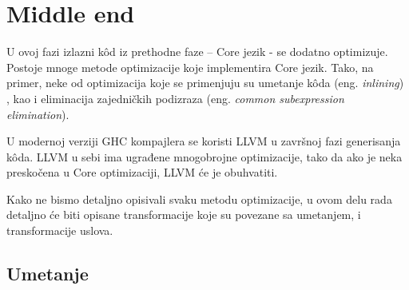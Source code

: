 \section{Middle end}
\label{sec:middle}

U ovoj fazi izlazni k\^{o}d iz prethodne faze – Core jezik - se dodatno optimizuje. Postoje mnoge metode optimizacije koje implementira Core jezik. Tako, na primer, neke od optimizacija koje se primenjuju su umetanje k\^{o}da (eng. \emph{inlining}) \cite{inliner}, kao i eliminacija zajedničkih podizraza (eng. \emph{common subexpression elimination}).

U modernoj verziji GHC kompajlera se koristi LLVM u završnoj fazi generisanja k\^{o}da. LLVM u sebi ima ugrađene mnogobrojne optimizacije, tako da ako je neka preskočena u Core optimizaciji, LLVM će je obuhvatiti.

Kako ne bismo detaljno opisivali svaku metodu optimizacije, u ovom delu  rada detaljno će biti opisane transformacije koje su povezane sa umetanjem, i transformacije uslova.

\subsection{Umetanje}
\label{subsec:podnaslovInline}

